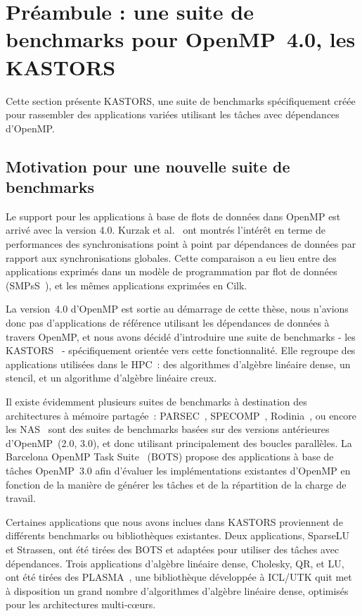 \section{Préambule : une suite de benchmarks pour OpenMP~4.0, les KASTORS}\label{sec:openmp:kastors}

Cette section présente KASTORS, une suite de benchmarks spécifiquement créée pour rassembler des applications variées utilisant les tâches avec dépendances d'OpenMP.

\subsection{Motivation pour une nouvelle suite de benchmarks}

Le support pour les applications à base de flots de données dans OpenMP est arrivé avec la version 4.0.
Kurzak et al.~\cite{Kurzak2010} ont montrés l'intérêt en terme de performances des synchronisations point à point par dépendances de données par rapport aux synchronisations globales.
Cette comparaison a eu lieu entre des applications exprimés dans un modèle de programmation par flot de données (SMPsS~\cite{BSC2008}), et les mêmes applications exprimées en Cilk.

La version~4.0 d'OpenMP est sortie au démarrage de cette thèse, nous n'avions donc pas d'applications de référence utilisant les dépendances de données à travers OpenMP, et nous avons décidé d'introduire une suite de benchmarks - les KASTORS~\cite{Virouleau2014} - spécifiquement orientée vers cette fonctionnalité.
Elle regroupe des applications utilisées dans le HPC~: des algorithmes d'algèbre linéaire dense, un stencil, et un algorithme d'algèbre linéaire creux.

Il existe évidemment plusieurs suites de benchmarks à destination des architectures à mémoire partagée~: PARSEC~\cite{Bienia2008}, SPECOMP~\cite{Aslot2001}, Rodinia~\cite{Rodinia2010}, ou encore les NAS~\cite{Bailey1994} sont des suites de benchmarks basées sur des versions antérieures d'OpenMP~(2.0, 3.0), et donc utilisant principalement des boucles parallèles.
La Barcelona OpenMP Task Suite~\cite{Duran2009} (BOTS) propose des applications à base de tâches OpenMP~3.0 afin d'évaluer les implémentations existantes d'OpenMP en fonction de la manière de générer les tâches et de la répartition de la charge de travail.

Certaines applications que nous avons inclues dans KASTORS proviennent de différents benchmarks ou bibliothèques existantes.
Deux applications, SparseLU et Strassen, ont été tirées des BOTS et adaptées pour utiliser des tâches avec dépendances.
Trois applications d'algèbre linéaire dense, Cholesky, QR, et LU, ont été tirées des PLASMA~\cite{Kurzak2013}, une bibliothèque développée à ICL/UTK quit met à disposition un grand nombre d'algorithmes d'algèbre linéaire dense, optimisés pour les architectures multi-cœurs.


